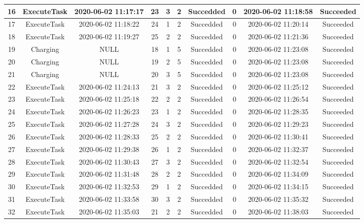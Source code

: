 \begin{table}[]
{\begin{tabular}{|c|c|c|c|c|c|c|c|c|c|}
16 & ExecuteTask & 2020-06-02 11:17:17 & 23 & 3 & 2 & Succedded & 0    & 2020-06-02 11:18:58 & Succeeded \\ \hline
17 & ExecuteTask & 2020-06-02 11:18:22 & 24 & 1 & 2 & Succedded & 0    & 2020-06-02 11:20:14 & Succeeded \\ \hline
18 & ExecuteTask & 2020-06-02 11:19:27 & 25 & 2 & 2 & Succedded & 0    & 2020-06-02 11:21:36 & Succeeded \\ \hline
19 & Charging    & NULL                & 18 & 1 & 5 & Succedded & 0 & 2020-06-02 11:23:08 & Succeeded \\ \hline
20 & Charging    & NULL                & 19 & 2 & 5 & Succedded & 0 & 2020-06-02 11:23:08 & Succeeded \\ \hline
21 & Charging    & NULL                & 20 & 3 & 5 & Succedded & 0 & 2020-06-02 11:23:08 & Succeeded \\ \hline
22 & ExecuteTask & 2020-06-02 11:24:13 & 21 & 3 & 2 & Succedded & 0 & 2020-06-02 11:25:12 & Succeeded \\ \hline
23 & ExecuteTask & 2020-06-02 11:25:18 & 22 & 2 & 2 & Succedded & 0 & 2020-06-02 11:26:54 & Succeeded \\ \hline
24 & ExecuteTask & 2020-06-02 11:26:23 & 23 & 1 & 2 & Succedded & 0 & 2020-06-02 11:28:35 & Succeeded \\ \hline
25 & ExecuteTask & 2020-06-02 11:27:28 & 24 & 3 & 2 & Succedded & 0 & 2020-06-02 11:29:23 & Succeeded \\ \hline
26 & ExecuteTask & 2020-06-02 11:28:33 & 25 & 2 & 2 & Succedded & 0    & 2020-06-02 11:30:41 & Succeeded \\ \hline
27 & ExecuteTask & 2020-06-02 11:29:38 & 26 & 1 & 2 & Succedded & 0    & 2020-06-02 11:32:37 & Succeeded \\ \hline
28 & ExecuteTask & 2020-06-02 11:30:43 & 27 & 3 & 2 & Succedded & 0    & 2020-06-02 11:32:54 & Succeeded \\ \hline
29 & ExecuteTask & 2020-06-02 11:31:48 & 28 & 2 & 2 & Succedded & 0    & 2020-06-02 11:34:09 & Succeeded \\ \hline
30 & ExecuteTask & 2020-06-02 11:32:53 & 29 & 1 & 2 & Succedded & 0    & 2020-06-02 11:34:15 & Succeeded \\ \hline
31 & ExecuteTask & 2020-06-02 11:33:58 & 30 & 3 & 2 & Succedded & 0    & 2020-06-02 11:35:32 & Succeeded \\ \hline
32 & ExecuteTask & 2020-06-02 11:35:03 & 21 & 2 & 2 & Succedded & 0    & 2020-06-02 11:38:03 & Succeeded \\ \hline

\end{tabular}}
\end{table}
